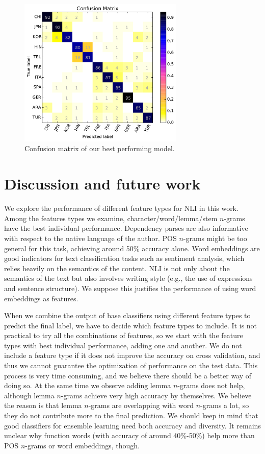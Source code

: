 \documentclass[11pt,letterpaper]{article}
\begin{document}
\begin{figure}
\centering
\includegraphics[width=0.7\textwidth]{confusion_matrix.pdf}
\caption{Confusion matrix of our best performing model.}
\label{fig:1}
\end{figure}

\section{Discussion and future work}

We explore the performance of different feature types for NLI in this work. Among the features types we examine, character/word/lemma/stem $n$-grams have the best individual performance. Dependency parses are also informative with respect to the native language of the author. POS $n$-grams might be too general for this task, achieving around 50\% accuracy alone. Word embeddings are good indicators for text classification tasks such as sentiment analysis, which relies heavily on the semantics of the content. NLI is not only about the semantics of the text but also involves writing style (e.g., the use of expressions and sentence structure). We suppose this justifies the performance of using word embeddings as features.

When we combine the output of base classifiers using different feature types to predict the final label, we have to decide which feature types to include. It is not practical to try all the combinations of features, so we start with the feature types with best individual performance, adding one and another. We do not include a feature type if it does not improve the accuracy on cross validation, and thus we cannot guarantee the optimization of performance on the test data. This process is very time consuming, and we believe there should be a better way of doing so. At the same time we observe adding lemma $n$-grams does not help, although lemma $n$-grams achieve very high accuracy by themselves. We believe the reason is that lemma $n$-grams are overlapping with word $n$-grams a lot, so they do not contribute more to the final prediction. We should keep in mind that good classifiers for ensemble learning need both accuracy and diversity. It remains unclear why function words (with accuracy of around 40\%-50\%) help more than POS $n$-grams or word embeddings, though.
\end{document}
